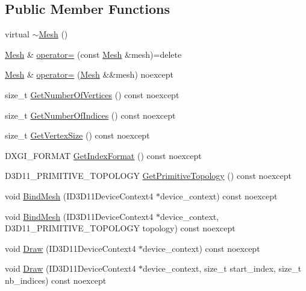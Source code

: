 \subsection*{Public Member Functions}
\begin{DoxyCompactItemize}
\item 
virtual \hyperlink{classmage_1_1_mesh_afa39b90805e434cabb0989878e335b9e}{$\sim$\+Mesh} ()
\item 
\hyperlink{classmage_1_1_mesh}{Mesh} \& \hyperlink{classmage_1_1_mesh_a5baf961af32b379671a59a082492bc5e}{operator=} (const \hyperlink{classmage_1_1_mesh}{Mesh} \&mesh)=delete
\item 
\hyperlink{classmage_1_1_mesh}{Mesh} \& \hyperlink{classmage_1_1_mesh_a58a0d5f808e097bec4017b10620a34f7}{operator=} (\hyperlink{classmage_1_1_mesh}{Mesh} \&\&mesh) noexcept
\item 
size\+\_\+t \hyperlink{classmage_1_1_mesh_af2787f8893895e9a8ebec70d3062288f}{Get\+Number\+Of\+Vertices} () const noexcept
\item 
size\+\_\+t \hyperlink{classmage_1_1_mesh_a27a6ec7761ebc90995186fe1da677a70}{Get\+Number\+Of\+Indices} () const noexcept
\item 
size\+\_\+t \hyperlink{classmage_1_1_mesh_a01ea4c5a09ffc6b4babc26a4f85a673e}{Get\+Vertex\+Size} () const noexcept
\item 
D\+X\+G\+I\+\_\+\+F\+O\+R\+M\+AT \hyperlink{classmage_1_1_mesh_ad5cda42bebb42c7ade7b3efdc788d570}{Get\+Index\+Format} () const noexcept
\item 
D3\+D11\+\_\+\+P\+R\+I\+M\+I\+T\+I\+V\+E\+\_\+\+T\+O\+P\+O\+L\+O\+GY \hyperlink{classmage_1_1_mesh_af64af13acf2f372515ffdc20ce45fcb4}{Get\+Primitive\+Topology} () const noexcept
\item 
void \hyperlink{classmage_1_1_mesh_af9ad71652a15e387774904dc8cabf28b}{Bind\+Mesh} (I\+D3\+D11\+Device\+Context4 $\ast$device\+\_\+context) const noexcept
\item 
void \hyperlink{classmage_1_1_mesh_a427afc68defc641bb020facdd07575f9}{Bind\+Mesh} (I\+D3\+D11\+Device\+Context4 $\ast$device\+\_\+context, D3\+D11\+\_\+\+P\+R\+I\+M\+I\+T\+I\+V\+E\+\_\+\+T\+O\+P\+O\+L\+O\+GY topology) const noexcept
\item 
void \hyperlink{classmage_1_1_mesh_a1f905a37627284cd3a292a593f79ef85}{Draw} (I\+D3\+D11\+Device\+Context4 $\ast$device\+\_\+context) const noexcept
\item 
void \hyperlink{classmage_1_1_mesh_a6fb394923d98c34cb33dc2cf333f4914}{Draw} (I\+D3\+D11\+Device\+Context4 $\ast$device\+\_\+context, size\+\_\+t start\+\_\+index, size\+\_\+t nb\+\_\+indices) const noexcept
\end{DoxyCompactItemize}
